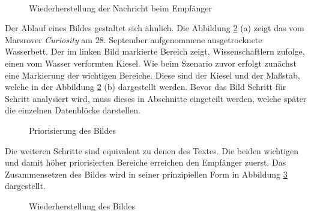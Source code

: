 \begin{figure}[H]
	\centering
	\hfill
	\\
	\label{fig:chatguiexample}
	\caption{Wiederherstellung der Nachricht beim Empfänger}
\end{figure}

Der Ablauf eines Bildes gestaltet sich ähnlich. Die Abbildung
\ref{fig:marsWaterResidue} (a) zeigt das vom Marsrover \textit{Curiosity}
am $28.$ September aufgenommene ausgetrocknete Wasserbett.  Der im
linken Bild markierte Bereich zeigt, Wissenschaftlern zufolge, einen vom Wasser
verformten Kiesel. Wie beim Szenario zuvor erfolgt zunächst eine Markierung der wichtigen
Bereiche. Diese sind der Kiesel und der Maßstab, welche in der
Abbildung \ref{fig:marsWaterResidue} (b) dargestellt werden. Bevor das Bild
Schritt für Schritt analysiert wird, muss dieses in Abschnitte eingeteilt
werden, welche später die einzelnen Datenblöcke darstellen.
 
\begin{figure}[H]
	\centering
	\hfill
	\hfill
	\label{fig:marsWaterResidue}
	\caption{Priorisierung des Bildes}
\end{figure}

Die weiteren Schritte sind equivalent zu denen des Textes. Die beiden wichtigen
und damit höher priorisierten Bereiche erreichen den Empfänger zuerst.
Das Zusammensetzen des Bildes wird in seiner prinzipiellen Form in
Abbildung \ref{fig:marsWaterResidueEmpfaenger} dargestellt.

\begin{figure}[H]
	\centering
	\hfill
	\hfill
	\label{fig:marsWaterResidueEmpfaenger}
	\caption{Wiederherstellung des Bildes}
\end{figure}